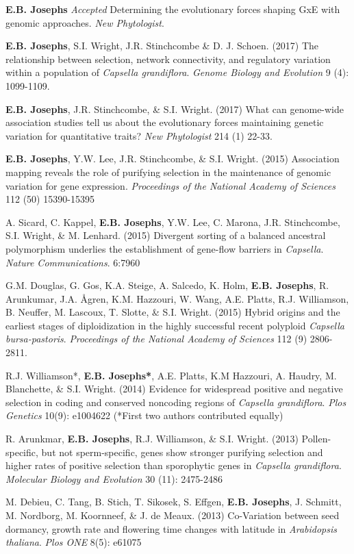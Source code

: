 \documentclass[letterpaper]{article}
\begin{document}
\begin{etaremune}
 \setlength{\itemsep}{4pt}
 \setlength{\parskip}{0pt}
  \item \textbf{E.B. Josephs} \textit{Accepted} Determining the evolutionary forces shaping GxE with genomic approaches. \textit{New Phytologist}.
 \item \textbf{E.B. Josephs}, S.I. Wright, J.R. Stinchcombe \& D. J. Schoen. (2017) The relationship between selection, network connectivity, and regulatory variation within a population of \textit{Capsella grandiflora}. \textit{Genome Biology and Evolution} 9 (4): 1099-1109.
 \item \textbf{E.B. Josephs}, J.R. Stinchcombe, \& S.I. Wright. (2017) What can genome-wide association studies tell us about the evolutionary forces maintaining genetic variation for quantitative traits? \textit{New Phytologist} 214 (1) 22-33.
  \item \textbf{E.B. Josephs}, Y.W. Lee, J.R. Stinchcombe, \& S.I. Wright. (2015) Association mapping reveals the role of purifying selection  in the maintenance of genomic variation for gene expression. \textit{Proceedings of the National Academy of Sciences} 112 (50) 15390-15395
  \item A. Sicard, C. Kappel, \textbf{E.B. Josephs}, Y.W. Lee, C. Marona, J.R. Stinchcombe, S.I. Wright, \& M. Lenhard. (2015) Divergent sorting of a balanced ancestral polymorphism underlies the establishment of gene-flow barriers in \textit{Capsella}. \textit{Nature Communications}. 6:7960
  \item G.M. Douglas, G. Gos, K.A. Steige, A. Salcedo, K. Holm, \textbf{E.B. Josephs}, R. Arunkumar, J.A. \AA gren,  K.M. Hazzouri, W. Wang, A.E. Platts, R.J. Williamson, B. Neuffer, M. Lascoux, T. Slotte, \& S.I. Wright. (2015) Hybrid origins and the earliest stages of diploidization in the highly successful recent polyploid \textit{Capsella bursa-pastoris}. \textit{Proceedings of the National Academy of Sciences} 112 (9) 2806-2811.
  \item R.J. Williamson*, \textbf{E.B. Josephs*}, A.E. Platts, K.M Hazzouri, A. Haudry, M. Blanchette, \& S.I. Wright. (2014) Evidence for widespread positive and negative selection in coding and conserved noncoding regions of \textit{Capsella grandiflora}. \textit{Plos Genetics} 10(9): e1004622 (*First two authors contributed equally)
  \item R. Arunkmar, \textbf{E.B. Josephs}, R.J. Williamson, \& S.I. Wright. (2013) Pollen-specific, but not sperm-specific, genes show stronger purifying selection and higher rates of positive selection than sporophytic genes in \textit{Capsella grandiflora}. \textit{Molecular Biology and Evolution} 30 (11): 2475-2486
  \item M. Debieu, C. Tang, B. Stich, T. Sikosek, S. Effgen, \textbf{E.B. Josephs}, J. Schmitt, M. Nordborg, M. Koornneef, \& J. de Meaux. (2013) Co-Variation between seed dormancy, growth rate and flowering time changes with latitude in \textit{Arabidopsis thaliana}.  \textit{Plos ONE} 8(5): e61075
\end{etaremune}
\end{document}
